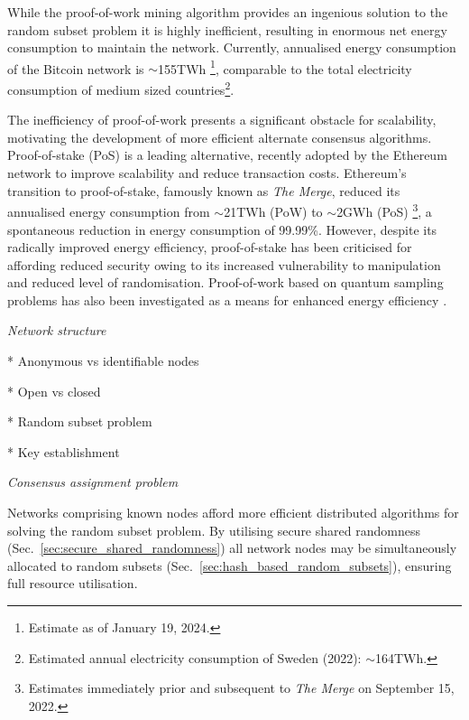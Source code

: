 While the proof-of-work mining algorithm provides an ingenious solution to the random subset problem it is highly inefficient, resulting in enormous net energy consumption to maintain the network. Currently, annualised energy consumption of the Bitcoin network is $\sim$155TWh \cite{CBECI}\footnote{Estimate as of January 19, 2024.}, comparable to the total electricity consumption of medium sized countries\footnote{Estimated annual electricity consumption of Sweden (2022): $\sim$164TWh.}.

The inefficiency of proof-of-work presents a significant obstacle for scalability, motivating the development of more efficient alternate consensus algorithms. Proof-of-stake (PoS) \cite{KingNadal, Bentov} is a leading alternative, recently adopted by the Ethereum network to improve scalability and reduce transaction costs. Ethereum's \cite{Buterin} transition to proof-of-stake, famously known as \emph{The Merge}, reduced its annualised energy consumption from $\sim$21TWh (PoW) to $\sim$2GWh (PoS) \cite{CBECI}\footnote{Estimates immediately prior and subsequent to \emph{The Merge} on September 15, 2022.}, a spontaneous reduction in energy consumption of 99.99\%. However, despite its radically improved energy efficiency, proof-of-stake has been criticised for affording reduced security owing to its increased vulnerability to manipulation and reduced level of randomisation. Proof-of-work based on quantum sampling problems has also been investigated as a means for enhanced energy efficiency \cite{QPoW}.


\begin{center}\emph{Network structure}\end{center}

* Anonymous vs identifiable nodes

* Open vs closed

* Random subset problem

* Key establishment

\begin{center}\emph{Consensus assignment problem}\end{center}

Networks comprising known nodes afford more efficient distributed algorithms for solving the random subset problem. By utilising secure shared randomness (Sec.~\ref{sec:secure_shared_randomness}) all network nodes may be simultaneously allocated to random subsets (Sec.~\ref{sec:hash_based_random_subsets}), ensuring full resource utilisation.

